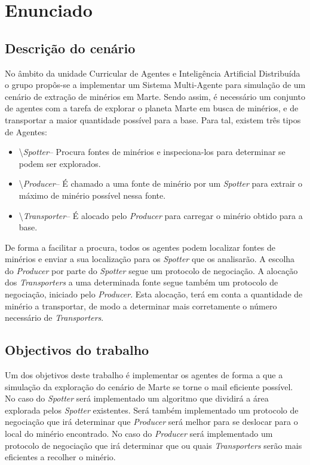 \documentclass[a4paper, 12pt, twoside]{scrreprt}
\begin{document}
\setcounter{page}{2}
\newpage

\tableofcontents

\clearpage
\chapter{Enunciado}
\setcounter{page}{3}

\section{Descrição do cenário}
No âmbito da unidade Curricular de Agentes e Inteligência Artificial Distribuída o grupo propôs-se a implementar um Sistema Multi-Agente para simulação de um cenário de extração de minérios em Marte.
Sendo assim, é necessário um conjunto de agentes com a tarefa de explorar o planeta Marte em busca de minérios, e de transportar a maior quantidade possível para a base. Para tal, existem três tipos de Agentes:

\begin{itemize}
	\item {\textbackslash}\textit{Spotter}– Procura fontes de minérios e inspeciona-los para determinar se podem ser explorados. 
	\item {\textbackslash}\textit{Producer}– É chamado a uma fonte de minério por um \textit{Spotter} para extrair o máximo de minério possível nessa fonte. 
	\item {\textbackslash}\textit{Transporter}– É alocado pelo \textit{Producer} para carregar o minério obtido para a base.
\end{itemize}

De forma a facilitar a procura, todos os agentes podem localizar fontes de minérios e enviar a sua localização para os \textit{Spotter} que os analisarão. A escolha do \textit{Producer} por parte do \textit{Spotter} segue um protocolo de negociação. A alocação dos \textit{Transporters} a uma determinada fonte segue também um protocolo de negociação, iniciado pelo \textit{Producer}. Esta alocação, terá em conta a quantidade de minério a transportar, de modo a determinar mais corretamente o número necessário de \textit{Transporters}.

\section{Objectivos do trabalho}
Um dos objetivos deste trabalho é implementar os agentes de forma a que a simulação da exploração do cenário de Marte se torne o mail eficiente possível. 
No caso do \textit{Spotter} será implementado um algoritmo que dividirá a área explorada pelos \textit{Spotter} existentes. Será também implementado um protocolo de negociação que irá determinar que \textit{Producer} será melhor para se deslocar para o local do minério encontrado.
No caso do \textit{Producer} será implementado um protocolo de negociação que irá determinar que ou quais \textit{Transporters} serão mais eficientes a recolher o minério.
\end{document}
